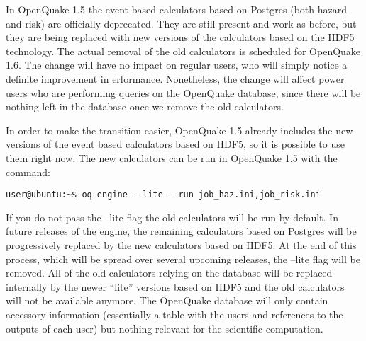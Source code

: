In OpenQuake 1.5 the event based calculators based on Postgres (both hazard and risk) are officially deprecated. They are still present and work as before, but they are being replaced with new versions of the calculators based on the HDF5 technology. The actual removal of the old calculators is scheduled for OpenQuake 1.6. The change will have no impact on regular users, who will simply notice a definite improvement in erformance. Nonetheless, the change will affect power users who are performing queries on the OpenQuake database, since there will be nothing left in the database once we remove the old calculators.

In order to make the transition easier, OpenQuake 1.5 already includes the new versions of the event based calculators based on HDF5, so it is possible to use them right now. The new calculators can be run in OpenQuake 1.5 with the command:

\begin{Verbatim}[frame=single, commandchars=\\\{\}, fontsize=\small]
user@ubuntu:~$ oq-engine --lite --run job_haz.ini,job_risk.ini
\end{Verbatim}

If you do not pass the --lite flag the old calculators will be run by default. In future releases of the engine, the remaining calculators based on Postgres will be progressively replaced by the new calculators based on HDF5. At the end of this process, which will be spread over several upcoming releases, the --lite flag will be removed. All of the old calculators relying on the database will be replaced internally by the newer ``lite'' versions based on HDF5 and the old calculators will not be available anymore. The OpenQuake database will only contain accessory information (essentially a table with the users and references to the outputs of each user) but nothing relevant for the scientific computation.